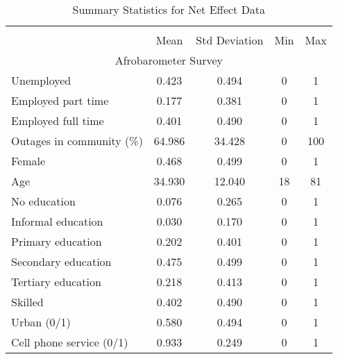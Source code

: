 \documentclass[12pt]{article}
\begin{document}
\begin{table}[htbp]
  \begin{adjustwidth}{-0.4in}{-0.4in}
  \centering
  \scriptsize
  \begin{minipage}[t]{0.55\textwidth}
    \vspace{5pt}
    \centering
    \caption{Summary Statistics for Net Effect Data}
    \label{tab:summarystats2}
    \begin{tabular}{l c c c c}
        \hline\hline  \\
        &        Mean&          Std Deviation&         Min&         Max\\
        \hline
        \multicolumn{5}{c}{Afrobarometer Survey}\\
        \hline
        Unemployed          &       0.423&       0.494&           0&           1\\
        Employed part time           &       0.177&       0.381&           0&           1\\
        Employed full time           &       0.401&       0.490&           0&           1\\
        Outages in community (\%) &       64.986&       34.428&           0&           100\\
        Female              &       0.468&       0.499&           0&           1\\
        Age                 &      34.930&      12.040&          18&          81\\
        No education              &       0.076&       0.265&           0&           1\\
        Informal education            &       0.030&       0.170&           0&           1\\
        Primary education             &       0.202&       0.401&           0&           1\\
        Secondary education           &       0.475&       0.499&           0&           1\\
        Tertiary education        &       0.218&       0.413&           0&           1\\
         Skilled             &       0.402&       0.490&           0&           1\\
        Urban (0/1)            &       0.580&       0.494&           0&           1\\
        Cell phone service (0/1)      &       0.933&       0.249&           0&           1\\

\end{tabular}
\end{minipage}
\end{adjustwidth}
\end{table}
\end{document}
